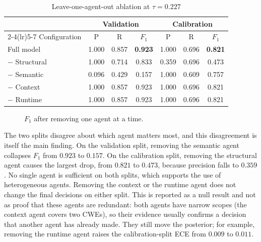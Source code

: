 \documentclass[conference]{IEEEtran}
\begin{document}
\begin{table}[t]
\centering
\caption{Leave-one-agent-out ablation at $\tau=0.227$}
\label{tab:ablation}
\small
\setlength{\tabcolsep}{3pt}
\begin{tabular}{lcccccc}
\toprule
 & \multicolumn{3}{c}{Validation} & \multicolumn{3}{c}{Calibration} \\
\cmidrule(lr){2-4}\cmidrule(lr){5-7}
Configuration & P & R & $F_1$ & P & R & $F_1$ \\
\midrule
Full model       & 1.000 & 0.857 & \textbf{0.923} & 1.000 & 0.696 & \textbf{0.821} \\
$-$ Structural   & 1.000 & 0.714 & 0.833 & 0.359 & 0.696 & 0.473 \\
$-$ Semantic     & 0.096 & 0.429 & 0.157 & 1.000 & 0.609 & 0.757 \\
$-$ Context      & 1.000 & 0.857 & 0.923 & 1.000 & 0.696 & 0.821 \\
$-$ Runtime      & 1.000 & 0.857 & 0.923 & 1.000 & 0.696 & 0.821 \\
\bottomrule
\end{tabular}
\end{table}

\begin{figure}[t]
\centering
{}
\caption{$F_1$ after removing one agent at a time.}
\label{fig:ablation}
\end{figure}

The two splits disagree about which agent matters most, and this
disagreement is itself the main finding. On the validation split, removing
the semantic agent collapses $F_1$ from $0.923$ to $0.157$. On the
calibration split, removing the structural agent causes the largest drop,
from $0.821$ to $0.473$, because precision falls to $0.359$. No single
agent is sufficient on both splits, which supports the use of
heterogeneous agents. Removing the context or the runtime agent does not
change the final decisions on either split. This is reported as a null
result and not as proof that these agents are redundant: both agents have
narrow scopes (the context agent covers two CWEs), so their evidence
usually confirms a decision that another agent has already made. They
still move the posterior; for example, removing the runtime agent raises
the calibration-split ECE from $0.009$ to $0.011$.
\end{document}

